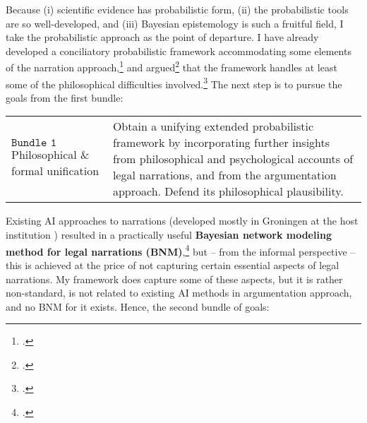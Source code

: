 \documentclass[11pt, a4paper]{article}
\begin{document}


Because (i) scientific evidence has probabilistic form, (ii) the probabilistic tools are so well-developed, and (iii) Bayesian epistemology is such a fruitful field, I  take the probabilistic approach as the point of departure. I have already developed 
 a conciliatory  probabilistic framework accommodating some elements of the  narration approach,\footcite{Urbaniak2017Narration-in-ju} and argued\footcite{Urbaniak2017} that the framework handles at least some of the philosophical difficulties involved.\footcite{Urbaniak2018} The next step is to pursue the goals from the first bundle:


\vspace{-3mm}

\begin{center}
\begin{tabular}{p{2.3cm}|p{13.2cm}}
\footnotesize \textbf{$\mathtt{Bundle \,\, 1}$} \newline  \tiny Philosophical \&  formal \newline  unification & 
Obtain a unifying extended  probabilistic framework by incorporating further insights  from philosophical and psychological accounts of legal narrations, and from the argumentation approach. Defend its philosophical plausibility.
\end{tabular}
\end{center}

\vspace{-3mm}


Existing AI approaches to narrations (developed mostly in Groningen at the host institution ) resulted in a practically useful  \textbf{Bayesian network modeling method for legal narrations (BNM)},\footcite{ bex2010hybrid,bex2013legal,vlek2013modeling,vlek2014building,verheij2014catch,verheij2015arguments,vlek2016stories,verheijproof2017} but -- from the informal perspective -- this is achieved at the price of not capturing certain essential aspects of legal narrations.  My framework does capture some of these aspects, but it is rather non-standard, is not related to existing AI methods in argumentation approach, and no BNM  for it exists. Hence, the second bundle of goals:
\end{document}
